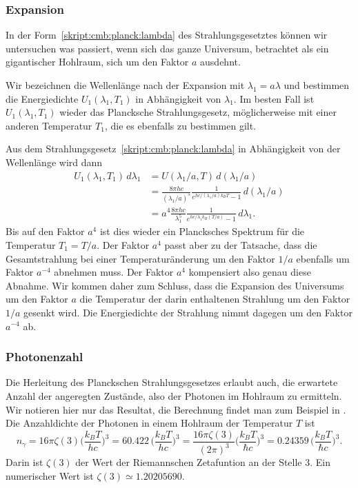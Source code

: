 \subsubsection{Expansion}
In der Form~\eqref{skript:cmb:planck:lambda}
des Strahlungsgesetztes können wir untersuchen was
passiert, wenn sich das ganze Universum, betrachtet als ein gigantischer
Hohlraum, sich um den Faktor $a$ ausdehnt.

Wir bezeichnen die Wellenlänge nach der Expansion mit $\lambda_1=a\lambda$
und bestimmen die Energiedichte $U_1(\lambda_1,T_1)$ in Abhängigkeit von
$\lambda_1$.
Im besten Fall ist $U_1(\lambda_1,T_1)$ wieder das Plancksche
Strahlungsgesetz, möglicherweise mit einer anderen Temperatur $T_1$, die
es ebenfalls zu bestimmen gilt.

Aus dem Strahlungsgesetz~\eqref{skript:cmb:planck:lambda} in Abhängigkeit
von der Wellenlänge wird dann
\begin{align*}
U_1(\lambda_1,T_1)\,d\lambda_1
&=
U(\lambda_1/a,T)\,d(\lambda_1/a)
\\
&=
\frac{8\pi hc}{(\lambda_1/a)^5}
\frac{1}{e^{hc/(\lambda_1/a) k_BT}-1}\,d(\lambda_1/a)
\\
&=
a^4
\frac{8\pi hc}{\lambda_1^5}
\frac{1}{e^{hc/\lambda_1 k_B(T/a)}-1}\,d\lambda_1.
\end{align*}
Bis auf den Faktor $a^4$ ist dies wieder ein Plancksches Spektrum
für die Temperatur $T_1=T/a$.
Der Faktor $a^4$ passt aber zu der Tatsache, dass die Gesamtstrahlung
bei einer Temperaturänderung um den Faktor $1/a$ ebenfalls um Faktor
$a^{-4}$ abnehmen muss.
Der Faktor $a^4$ kompensiert also genau diese Abnahme.
Wir kommen daher zum Schluss, dass die Expansion des Universums um den
Faktor $a$ die Temperatur der darin enthaltenen Strahlung um den Faktor
$1/a$ gesenkt wird.
Die Energiedichte der Strahlung nimmt dagegen um den Faktor $a^{-4}$ ab.

\subsubsection{Photonenzahl}
Die Herleitung des Planckschen Strahlungsgesetzes erlaubt auch, die
erwartete Anzahl der angeregten Zustände, also der Photonen im
Hohlraum zu ermitteln.
Wir notieren hier nur das Resultat, die Berechnung findet man zum
Beispiel in \cite[Abschnitt 1.9]{skript:feynman}.
Die Anzahldichte der Photonen in einem Hohlraum der Temperatur $T$ ist
\begin{equation}
n_\gamma
=
16\pi\zeta(3)
\biggl(\frac{k_BT}{hc}\biggr)^3
=
60.422\,
\biggl(\frac{k_BT}{hc}\biggr)^3
=
\frac{16\pi\zeta(3)}{(2\pi)^3}
\biggl(\frac{k_BT}{\hbar c}\biggr)^3
=
0.24359\,
\biggl(\frac{k_BT}{\hbar c}\biggr)^3.
\label{skript:cmb:photonenzahl}
\end{equation}
Darin ist $\zeta(3)$ der Wert der Riemannschen Zetafuntion an der
Stelle $3$.
%
%
Ein numerischer Wert ist $\zeta(3)\simeq 1.20205690$.

